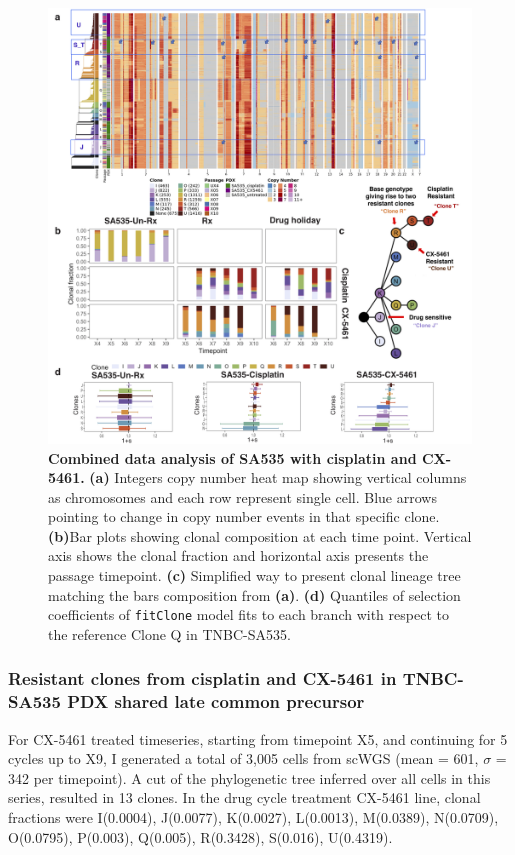 \begin{figure}
\centering
\includegraphics[width=\textwidth]{Figures/chap4/SA535combinebarplots.png}
	
\caption[Combined data analysis of SA535 with cisplatin and CX-5461]
	{\small
	\textbf{Combined data analysis of SA535 with cisplatin and CX-5461.}
		\textbf{(a)} Integers copy number heat map showing vertical columns as chromosomes and each row represent single cell. Blue arrows pointing to change in copy number events in that specific clone. \textbf{(b)}Bar plots showing clonal composition at each time point. Vertical axis shows the clonal fraction and horizontal axis presents the passage timepoint. \textbf{(c)} Simplified way to present clonal lineage tree matching the bars composition from \textbf{(a)}. \textbf{(d)} Quantiles of selection coefficients of \texttt{fitClone} model fits to each branch with respect to the reference Clone Q in TNBC-SA535. 
	}
	\label{fig:SA535combinebarplots}
\end{figure}


\subsubsection{Resistant clones from cisplatin and CX-5461 in TNBC-SA535 PDX shared late common precursor}
For CX-5461 treated timeseries, starting from timepoint X5, and continuing for 5 cycles up to X9, I generated a total of 3,005 cells from scWGS (mean = 601, $\sigma$ = 342 per timepoint). A cut of the phylogenetic tree inferred over all cells in this series, resulted in 13 clones. In the drug cycle treatment CX-5461 line, clonal fractions were I(0.0004), J(0.0077), K(0.0027), L(0.0013), M(0.0389), N(0.0709), O(0.0795), P(0.003), Q(0.005), R(0.3428), S(0.016), U(0.4319). 



